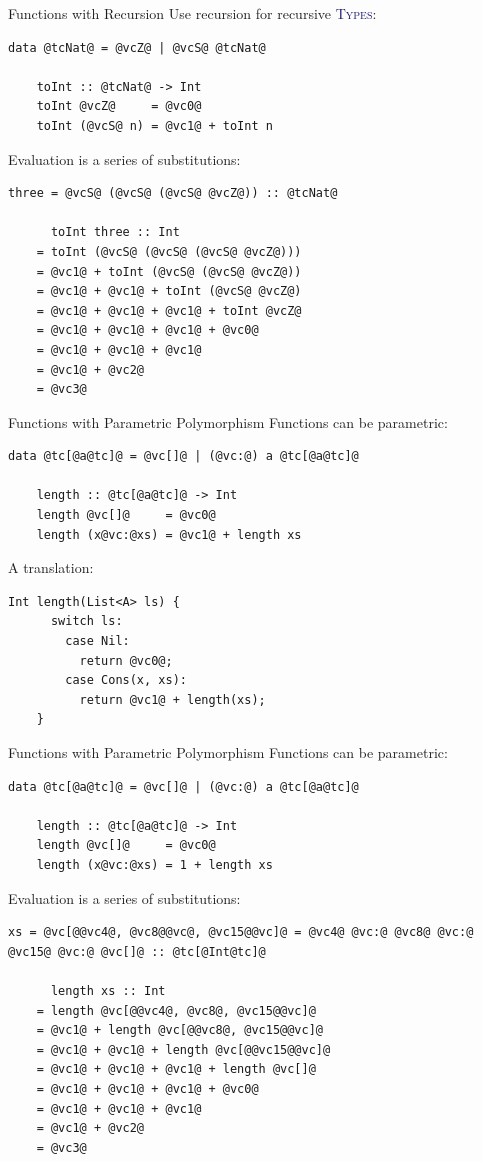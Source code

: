 \documentclass[xcolor={usenames,dvipsnames}]{beamer}
\newcommand{\htycon}[1]{\textcolor{MidnightBlue}{\textsc{#1}}}
\begin{document}
\begin{frame}[fragile]{Functions with Recursion}
  Use recursion for recursive \htycon{Types}:
  \begin{lstlisting}[style=hask]
    data @tcNat@ = @vcZ@ | @vcS@ @tcNat@

    toInt :: @tcNat@ -> Int
    toInt @vcZ@     = @vc0@
    toInt (@vcS@ n) = @vc1@ + toInt n
  \end{lstlisting}

  Evaluation is a series of substitutions:
  \begin{lstlisting}[style=hask]
    three = @vcS@ (@vcS@ (@vcS@ @vcZ@)) :: @tcNat@

      toInt three :: Int
    = toInt (@vcS@ (@vcS@ (@vcS@ @vcZ@)))
    = @vc1@ + toInt (@vcS@ (@vcS@ @vcZ@))
    = @vc1@ + @vc1@ + toInt (@vcS@ @vcZ@)
    = @vc1@ + @vc1@ + @vc1@ + toInt @vcZ@
    = @vc1@ + @vc1@ + @vc1@ + @vc0@
    = @vc1@ + @vc1@ + @vc1@
    = @vc1@ + @vc2@
    = @vc3@
  \end{lstlisting}
\end{frame}

\begin{frame}[fragile]{Functions with Parametric Polymorphism}
  Functions can be parametric:
  \begin{lstlisting}[style=hask]
    data @tc[@a@tc]@ = @vc[]@ | (@vc:@) a @tc[@a@tc]@

    length :: @tc[@a@tc]@ -> Int
    length @vc[]@     = @vc0@
    length (x@vc:@xs) = @vc1@ + length xs
  \end{lstlisting}

  A translation:
  \begin{lstlisting}[style=hask]
    Int length(List<A> ls) {
      switch ls:
        case Nil:
          return @vc0@;
        case Cons(x, xs):
          return @vc1@ + length(xs);
    }
  \end{lstlisting}
\end{frame}

\begin{frame}[fragile]{Functions with Parametric Polymorphism}
  Functions can be parametric:
  \begin{lstlisting}[style=hask]
    data @tc[@a@tc]@ = @vc[]@ | (@vc:@) a @tc[@a@tc]@

    length :: @tc[@a@tc]@ -> Int
    length @vc[]@     = @vc0@
    length (x@vc:@xs) = 1 + length xs
  \end{lstlisting}

  Evaluation is a series of substitutions:
  \begin{lstlisting}[style=hask]
    xs = @vc[@@vc4@, @vc8@@vc@, @vc15@@vc]@ = @vc4@ @vc:@ @vc8@ @vc:@ @vc15@ @vc:@ @vc[]@ :: @tc[@Int@tc]@

      length xs :: Int
    = length @vc[@@vc4@, @vc8@, @vc15@@vc]@
    = @vc1@ + length @vc[@@vc8@, @vc15@@vc]@
    = @vc1@ + @vc1@ + length @vc[@@vc15@@vc]@
    = @vc1@ + @vc1@ + @vc1@ + length @vc[]@
    = @vc1@ + @vc1@ + @vc1@ + @vc0@
    = @vc1@ + @vc1@ + @vc1@
    = @vc1@ + @vc2@
    = @vc3@
  \end{lstlisting}
\end{frame}
\end{document}
